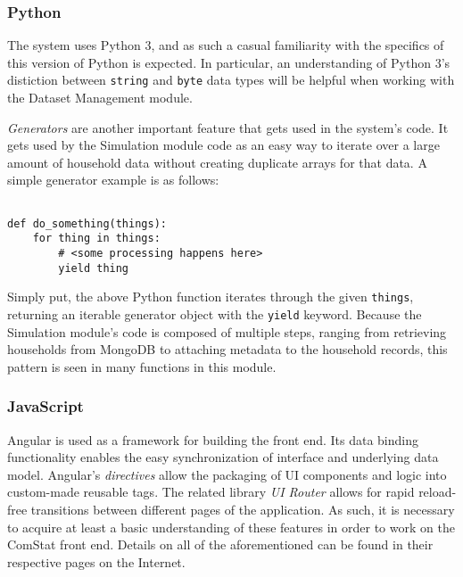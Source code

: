 \subsubsection{Python}

The system uses Python 3, and as such a casual familiarity with the specifics of this version of Python is expected. In particular, an understanding of Python 3's distiction between \texttt{string} and \texttt{byte} data types will be helpful when working with the Dataset Management module.

\emph{Generators} are another important feature that gets used in the system's code. It gets used by the Simulation module code as an easy way to iterate over a large amount of household data without creating duplicate arrays for that data. A simple generator example is as follows:

\begin{lstlisting}

def do_something(things):
    for thing in things:
        # <some processing happens here>
        yield thing

\end{lstlisting}

Simply put, the above Python function iterates through the given \texttt{things}, returning an iterable generator object with the \texttt{yield} keyword. Because the Simulation module's code is composed of multiple steps, ranging from retrieving households from MongoDB to attaching metadata to the household records, this pattern is seen in many functions in this module.


\subsubsection{JavaScript} 

Angular is used as a framework for building the front end. Its data binding functionality enables the easy synchronization of interface and underlying data model. Angular's \emph{directives} allow the packaging of UI components and logic into custom-made reusable tags. The related library \emph{UI Router} allows for rapid reload-free transitions between different pages of the application. As such, it is necessary to acquire at least a basic understanding of these features in order to work on the ComStat front end. Details on all of the aforementioned can be found in their respective pages on the Internet.


